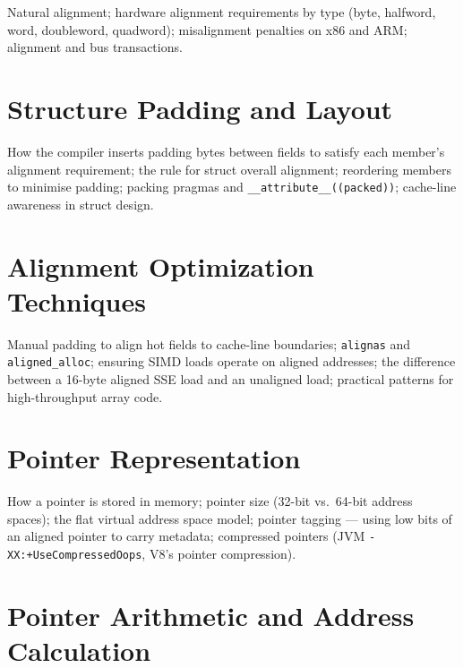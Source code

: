 Natural alignment; hardware alignment requirements by type (byte, halfword,
word, doubleword, quadword); misalignment penalties on x86 and ARM;
alignment and bus transactions.

\chapter{Structure Padding and Layout}
\label{ch:struct-padding}

How the compiler inserts padding bytes between fields to satisfy each
member's alignment requirement; the rule for struct overall alignment;
reordering members to minimise padding; packing pragmas and
\texttt{\_\_attribute\_\_((packed))}; cache-line awareness in struct design.

\chapter{Alignment Optimization Techniques}
\label{ch:alignment-optimization}

Manual padding to align hot fields to cache-line boundaries;
\texttt{alignas} and \texttt{aligned\_alloc}; ensuring SIMD loads operate
on aligned addresses; the difference between a 16-byte aligned SSE load
and an unaligned load; practical patterns for high-throughput array code.


%
%

\chapter{Pointer Representation}
\label{ch:pointer-repr}

How a pointer is stored in memory; pointer size (32-bit vs.\ 64-bit address
spaces); the flat virtual address space model; pointer tagging — using low
bits of an aligned pointer to carry metadata; compressed pointers (JVM
\texttt{-XX:+UseCompressedOops}, V8's pointer compression).

\chapter{Pointer Arithmetic and Address Calculation}
\label{ch:pointer-arithmetic}

